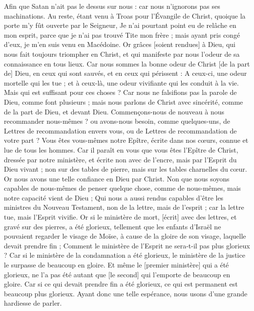 \begin{multicols}{2}
Afin que Satan n'ait pas le dessus sur nous : car nous n'ignorons pas ses machinations.
Au reste, étant venu à Troas pour l'Évangile de Christ, quoique la porte m'y fût ouverte par le Seigneur,
Je n'ai pourtant point eu de relâche en mon esprit, parce que je n'ai pas trouvé Tite mon frère ; mais ayant pris congé d'eux, je m'en suis venu en Macédoine.
Or grâces [soient rendues] à Dieu, qui nous fait toujours triompher en Christ, et qui manifeste par nous l'odeur de sa connaissance en tous lieux.
Car nous sommes la bonne odeur de Christ [de la part de] Dieu, en ceux qui sont sauvés, et en ceux qui périssent :
A ceux-ci, une odeur mortelle qui les tue ; et à ceux-là, une odeur vivifiante qui les conduit à la vie. Mais qui est suffisant pour ces choses ?
Car nous ne falsifions pas la parole de Dieu, comme font plusieurs ; mais nous parlons de Christ avec sincérité, comme de la part de Dieu, et devant Dieu.
\VerseOne{}Commençons-nous de nouveau à nous recommander nous-mêmes ? ou avons-nous besoin, comme quelques-uns, de Lettres de recommandation envers vous, ou de Lettres de recommandation de votre part ?
Vous êtes vous-mêmes notre Epître, écrite dans nos cœurs, connue et lue de tous les hommes.
Car il paraît en vous que vous êtes l'Epître de Christ, dressée par notre ministère, et écrite non avec de l'encre, mais par l'Esprit du Dieu vivant ; non sur des tables de pierre, mais sur les tables charnelles du cœur.
Or nous avons une telle confiance en Dieu par Christ.
Non que nous soyons capables de nous-mêmes de penser quelque chose, comme de nous-mêmes, mais notre capacité vient de Dieu ;
Qui nous a aussi rendus capables d'être les ministres du Nouveau Testament, non de la lettre, mais de l'esprit ; car la lettre tue, mais l'Esprit vivifie.
Or si le ministère de mort, [écrit] avec des lettres, et gravé sur des pierres, a été glorieux, tellement que les enfants d'Israël ne pouvaient regarder le visage de Moïse, à cause de la gloire de son visage, laquelle devait prendre fin ;
Comment le ministère de l'Esprit ne sera-t-il pas plus glorieux ?
Car si le ministère de la condamnation a été glorieux, le ministère de la justice le surpasse de beaucoup en gloire.
Et même le [premier ministère] qui a été glorieux, ne l'a pas été autant que [le second] qui l'emporte de beaucoup en gloire.
Car si ce qui devait prendre fin a été glorieux, ce qui est permanent est beaucoup plus glorieux.
Ayant donc une telle espérance, nous usons d'une grande hardiesse de parler.

\end{multicols}
